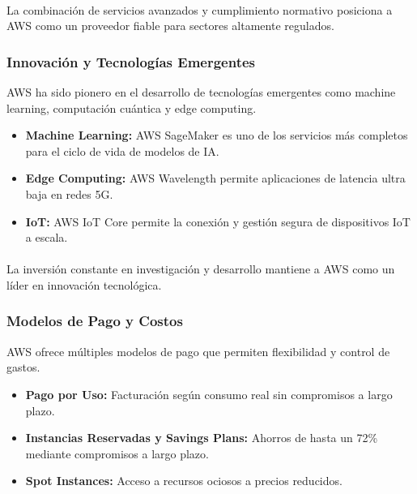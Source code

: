 {                \paragraph{} La combinación de servicios avanzados y cumplimiento normativo posiciona a AWS como un proveedor fiable para sectores altamente regulados.
                
            \subsubsection{Innovación y Tecnologías Emergentes}
                AWS ha sido pionero en el desarrollo de tecnologías emergentes como machine learning, computación cuántica y edge computing.
                
                \begin{itemize}
                    \item \textbf{Machine Learning:} AWS SageMaker es uno de los servicios más completos para el ciclo de vida de modelos de IA.
                    \item \textbf{Edge Computing:} AWS Wavelength permite aplicaciones de latencia ultra baja en redes 5G.
                    \item \textbf{IoT:} AWS IoT Core permite la conexión y gestión segura de dispositivos IoT a escala.
                \end{itemize}
                
                \paragraph{} La inversión constante en investigación y desarrollo mantiene a AWS como un líder en innovación tecnológica.
                
            \subsubsection{Modelos de Pago y Costos}
                AWS ofrece múltiples modelos de pago que permiten flexibilidad y control de gastos.
                
                \begin{itemize}
                    \item \textbf{Pago por Uso:} Facturación según consumo real sin compromisos a largo plazo.
                    \item \textbf{Instancias Reservadas y Savings Plans:} Ahorros de hasta un 72\% mediante compromisos a largo plazo.
                    \item \textbf{Spot Instances:} Acceso a recursos ociosos a precios reducidos.
                \end{itemize}
                
}
